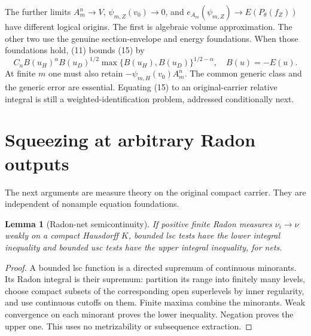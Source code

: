 \documentclass[10pt]{article}
\newtheorem{lemma}[theorem]{Lemma}
\begin{document}
The further limits $A_m^n\to V$, $\psi_{m,Z}(v_0)\to0$, and
$e_{A_m}(\psi_{m,Z})\to E(P_\theta(f_Z))$ have different
logical origins. The first is algebraic volume approximation.
The other two use the genuine section-envelope and energy foundations.
When those foundations hold, (11) bounds (15) by
\[
 C_n B(u_H)^\alpha B(u_D)^{1/2}
          \max\{B(u_H),B(u_D)\}^{1/2-\alpha},\quad B(u)=-E(u).
                                                               \tag{16}
\]
At finite $m$ one must also retain
$-\psi_{m,H}(v_0)A_m^n$. The common generic class and the
generic error are essential.
Equating (15) to an original-carrier relative integral is still
a weighted-identification problem, addressed conditionally next.

\section{Squeezing at arbitrary Radon outputs}
The next arguments are measure theory on the original compact carrier.
They are independent of nonample equation foundations.

\begin{lemma}[Radon-net semicontinuity]\label{port}
If positive finite Radon measures $\nu_i\to\nu$ weakly on a compact
Hausdorff $K$, bounded lsc tests have the lower integral inequality
and bounded usc tests have the upper integral inequality, for nets.
\end{lemma}
\begin{proof}
A bounded lsc function is a directed supremum of continuous minorants.
Its Radon integral is their supremum: partition its range into finitely
many levels, choose compact subsets of the corresponding open
superlevels by inner regularity, and use continuous cutoffs on them.
Finite maxima combine the minorants. Weak convergence on each
minorant proves the lower inequality. Negation proves the upper one.
This uses no metrizability or subsequence extraction.
\end{proof}
\end{document}
